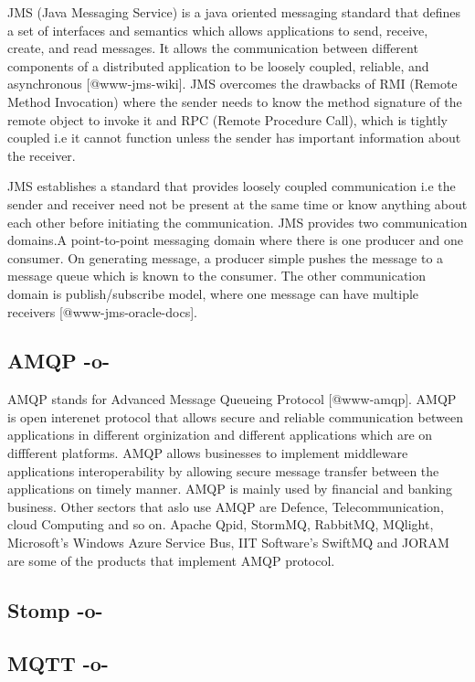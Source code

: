 JMS (Java Messaging Service) is a java oriented messaging standard
that defines a set of interfaces and semantics which allows
applications to send, receive, create, and read messages.  It allows
the communication between different components of a distributed
application to be loosely coupled, reliable, and asynchronous
[@www-jms-wiki]. JMS overcomes the drawbacks of RMI (Remote
Method Invocation) where the sender needs to know the method signature
of the remote object to invoke it and RPC (Remote Procedure Call),
which is tightly coupled i.e it cannot function unless the sender has
important information about the receiver.

JMS establishes a standard that provides loosely coupled communication
i.e the sender and receiver need not be present at the same time or
know anything about each other before initiating the communication.
JMS provides two communication domains.A point-to-point messaging
domain where there is one producer and one consumer. On generating
message, a producer simple pushes the message to a message queue which
is known to the consumer. The other communication domain is
publish/subscribe model, where one message can have multiple
receivers [@www-jms-oracle-docs].

\subsection{AMQP -o-}

AMQP stands for Advanced Message Queueing
Protocol [@www-amqp]. AMQP is open interenet protocol that allows
secure and reliable communication between applications in different
orginization and different applications which are on diffferent
platforms. AMQP allows businesses to implement middleware applications
interoperability by allowing secure message transfer between the
applications on timely manner. AMQP is mainly used by financial and
banking business. Other sectors that aslo use AMQP are Defence,
Telecommunication, cloud Computing and so on.  Apache Qpid, StormMQ,
RabbitMQ, MQlight, Microsoft's Windows Azure Service Bus, IIT
Software's SwiftMQ and JORAM are some of the products that implement
AMQP protocol.



\subsection{Stomp -o-}



\subsection{MQTT -o-}
     
